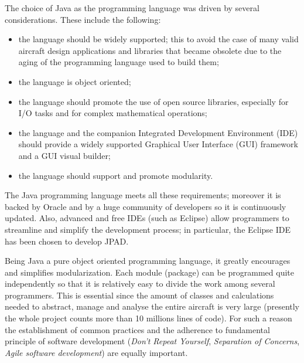 The choice of Java as the programming language was driven by several considerations. These include the following:
\begin{itemize}
\item the language should be widely supported; this to avoid the case of many valid aircraft design applications and libraries that became obsolete due to the aging of the programming language used to build them;
\item the language is object oriented;
\item the language should promote the use of open source libraries, especially for I/O tasks and for complex mathematical operations;
\item the language and the companion Integrated Development Environment (IDE) should provide a widely supported Graphical User Interface (GUI) framework and a GUI visual builder;
\item the language should support and promote modularity.
\end{itemize}

The Java programming language meets all these requirements; moreover it is backed by Oracle and by a huge community of developers so it is continuously updated. Also, advanced and free IDEs (such as Eclipse) allow programmers to streamline and simplify the development process; in particular, the Eclipse IDE has been chosen to develop JPAD.

Being Java a pure object oriented programming language, it greatly encourages and simplifies modularization. Each module (package) can be programmed quite independently so that it is relatively easy to divide the work among several programmers. This is essential since the amount of classes and calculations needed to abstract, manage and analyse the entire aircraft is very large (presently the whole project counts more than 10 millions lines of code). For such a reason the establishment of common practices and the adherence to fundamental principle of software development (\emph{Don’t Repeat Yourself}, \emph{Separation of Concerns}, \emph{Agile software development}) are equally important.
